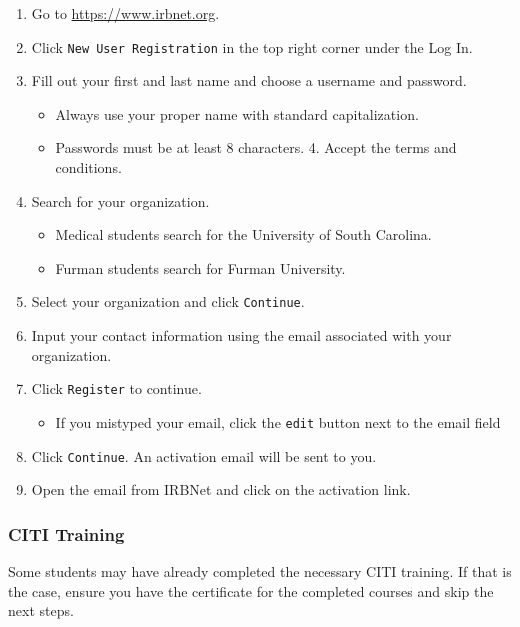 \documentclass[
]{book}
\providecommand{\tightlist}{%
  \setlength{\itemsep}{0pt}\setlength{\parskip}{0pt}}
\begin{document}
\begin{enumerate}
\def\labelenumi{\arabic{enumi}.}
\tightlist
\item
  Go to \url{https://www.irbnet.org}.
\item
  Click \texttt{New\ User\ Registration} in the top right corner under the Log In.
\item
  Fill out your first and last name and choose a username and password.

  \begin{itemize}
  \tightlist
  \item
    Always use your proper name with standard capitalization.
  \item
    Passwords must be at least 8 characters. 4. Accept the terms and conditions.
  \end{itemize}
\item
  Search for your organization.

  \begin{itemize}
  \tightlist
  \item
    Medical students search for the University of South Carolina.
  \item
    Furman students search for Furman University.
  \end{itemize}
\item
  Select your organization and click \texttt{Continue}.
\item
  Input your contact information using the email associated with your organization.
\item
  Click \texttt{Register} to continue.

  \begin{itemize}
  \tightlist
  \item
    If you mistyped your email, click the \texttt{edit} button next to the email field
  \end{itemize}
\item
  Click \texttt{Continue}. An activation email will be sent to you.
\item
  Open the email from IRBNet and click on the activation link.
\end{enumerate}

\hypertarget{CITITraining}{%
\subsubsection{CITI Training}\label{CITITraining}}

Some students may have already completed the necessary CITI training. If that is the case, ensure you have the certificate for the completed courses and skip the next steps.
\end{document}
